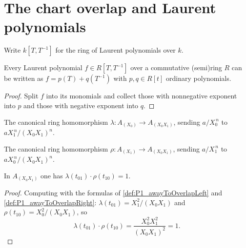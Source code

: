 \section{The chart overlap and Laurent polynomials}

Write \(k[T, T^{-1}]\) for the ring of Laurent polynomials over \(k\).

\begin{lemma}
  \label{lem:laurent_span}
  \leanok
  Every Laurent polynomial \(f \in R[T, T^{-1}]\) over a commutative (semi)ring \(R\) can be
  written as \(f = p(T) + q(T^{-1})\) with \(p, q \in R[t]\) ordinary polynomials.
\end{lemma}
\begin{proof}
  \leanok
  Split \(f\) into its monomials and collect those with nonnegative exponent into \(p\) and
  those with negative exponent into \(q\).
\end{proof}

\begin{definition}
  \label{def:P1_awayToOverlapLeft}
  \leanok
  The canonical ring homomorphism \(\lambda : A_{(X_0)} \to A_{(X_0 X_1)}\), sending
  \(a / X_0^{\,n}\) to \(a X_1^{\,n} / (X_0 X_1)^{n}\).
\end{definition}

\begin{definition}
  \label{def:P1_awayToOverlapRight}
  \leanok
  The canonical ring homomorphism \(\rho : A_{(X_1)} \to A_{(X_0 X_1)}\), sending
  \(a / X_1^{\,n}\) to \(a X_0^{\,n} / (X_0 X_1)^{n}\).
\end{definition}

\begin{lemma}
  \label{lem:P1_coord_mul}
  \leanok
  In \(A_{(X_0 X_1)}\) one has \(\lambda(t_{01}) \cdot \rho(t_{10}) = 1\).
\end{lemma}
\begin{proof}
  \leanok
  Computing with the formulas of \ref{def:P1_awayToOverlapLeft} and
  \ref{def:P1_awayToOverlapRight}:
  \(\lambda(t_{01}) = X_1^2 / (X_0 X_1)\) and \(\rho(t_{10}) = X_0^2 / (X_0 X_1)\), so
  \[
    \lambda(t_{01}) \cdot \rho(t_{10})
      = \frac{X_0^2 X_1^2}{(X_0 X_1)^2} = 1 .
  \]
\end{proof}

